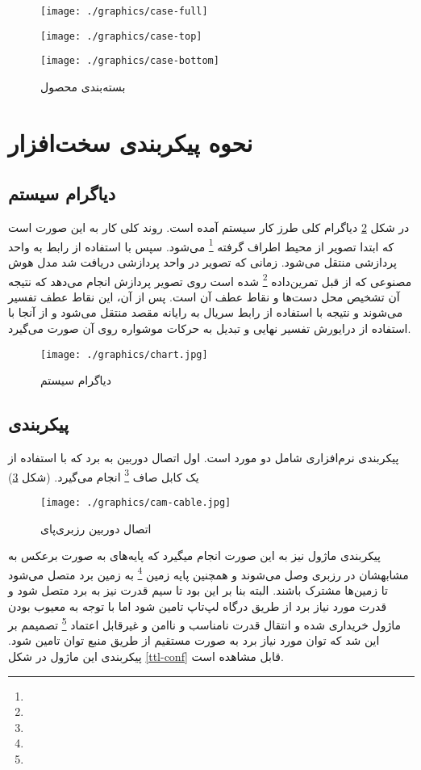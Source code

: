 \documentclass{article}
\begin{document}
\begin{figure}
	\centering
	
	\texttt{[image: ./graphics/case-full]}
	
	\texttt{[image: ./graphics/case-top]}
	
	\texttt{[image: ./graphics/case-bottom]}
	
	\caption{بسته‌بندی محصول}
	\label{case}
\end{figure}

\section{نحوه پیکر‌بندی سخت‌افزار}
\subsection{دیاگرام سیستم}
در شکل \ref{chart} دیاگرام کلی طرز کار سیستم‌ آمده است. روند کلی کار به این صورت است که
ابتدا تصویر از محیط اطراف گرفته \footnote{} می‌شود. سپس با استفاده از رابط  به واحد پردازشی منتقل می‌شود. زمانی که تصویر در واحد پردازشی دریافت شد مدل هوش
مصنوعی که از قبل تمرین‌داده \footnote{} شده است روی تصویر پردازش انجام می‌دهد که
نتیجه آن تشخیص محل دست‌ها و نقاط عطف آن است. پس از آن، این نقاط عطف تفسیر می‌شوند و نتیجه با
استفاده از رابط سریال به رایانه مقصد منتقل می‌شود و از آنجا با استفاده از درایورش  تفسیر
نهایی و تبدیل به حرکات موشواره روی آن صورت می‌گیرد.

\begin{figure}
	\centering
	\texttt{[image: ./graphics/chart.jpg]}
	\caption{دیاگرام سیستم}
	\label{chart}
\end{figure}


\subsection{پیکربندی}
پیکربندی نرم‌افزاری شامل دو مورد است. اول اتصال دوربین به برد که با استفاده از یک کابل صاف
\footnote{} انجام می‌گیرد.  (شکل \ref{cam-cable})

\begin{figure}
	\centering
	\texttt{[image: ./graphics/cam-cable.jpg]}
	\caption{اتصال دوربین رزبری‌پای}
	\label{cam-cable}
\end{figure}

پیکربندی ماژول  نیز به این صورت انجام میگیرد که پایه‌های  به صورت برعکس به مشابهشان در رزبری وصل می‌شوند و همچنین پایه‌ زمین \footnote{} به زمین برد
متصل می‌شود تا زمین‌ها مشترک باشند. البته بنا بر این بود تا سیم قدرت نیز به برد متصل شود و
قدرت مورد نیاز برد از طریق درگاه  لپ‌تاپ تامین شود اما با توجه به معیوب بودن ماژول
خریداری شده و انتقال قدرت نامناسب و ناامن و غیرقابل اعتماد \footnote{}
تصمیمم بر این شد که توان مورد نیاز برد به صورت مستقیم از طریق منبع توان تامین شود.
پیکربندی این ماژول در شکل \ref{ttl-conf} قابل مشاهده است.
\end{document}
